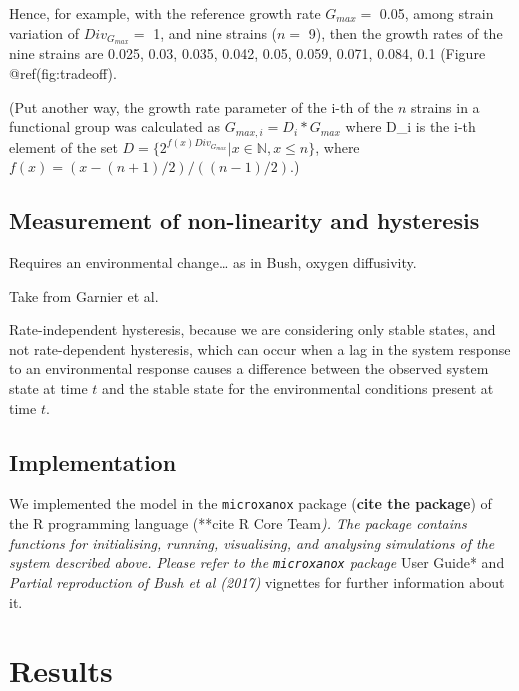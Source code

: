 \documentclass{article}
\begin{document}
Hence, for example, with the reference growth rate \(G_{max} =\) 0.05,
among strain variation of \(Div_{G_{max}} =\) 1, and nine strains
(\(n =\) 9), then the growth rates of the nine strains are 0.025, 0.03,
0.035, 0.042, 0.05, 0.059, 0.071, 0.084, 0.1 (Figure @ref(fig:tradeoff).

(Put another way, the growth rate parameter of the i-th of the \(n\)
strains in a functional group was calculated as
\(G_{max, i} = D_i * G_{max}\) where D\_i is the i-th element of the set
\(D = \{2^{f(x)Div_{G_{max}}} | x \in \mathbb{N}, x \leq n\}\), where
\(f(x) = (x-(n+1)/2) / (( n-1)/2)\).)

\hypertarget{measurement-of-non-linearity-and-hysteresis}{%
\subsection{Measurement of non-linearity and
hysteresis}\label{measurement-of-non-linearity-and-hysteresis}}

Requires an environmental change\ldots{} as in Bush, oxygen diffusivity.

Take from Garnier et al.

Rate-independent hysteresis, because we are considering only stable
states, and not rate-dependent hysteresis, which can occur when a lag in
the system response to an environmental response causes a difference
between the observed system state at time \(t\) and the stable state for
the environmental conditions present at time \(t\).

\hypertarget{implementation}{%
\subsection{Implementation}\label{implementation}}

We implemented the model in the \texttt{microxanox} package
(\textbf{cite the package}) of the R programming language (**cite R Core
Team\emph{). The package contains functions for initialising, running,
visualising, and analysing simulations of the system described above.
Please refer to the \texttt{microxanox} package} User Guide* and
\emph{Partial reproduction of Bush et al (2017)} vignettes for further
information about it.

\hypertarget{results}{%
\section{Results}\label{results}}
\end{document}
